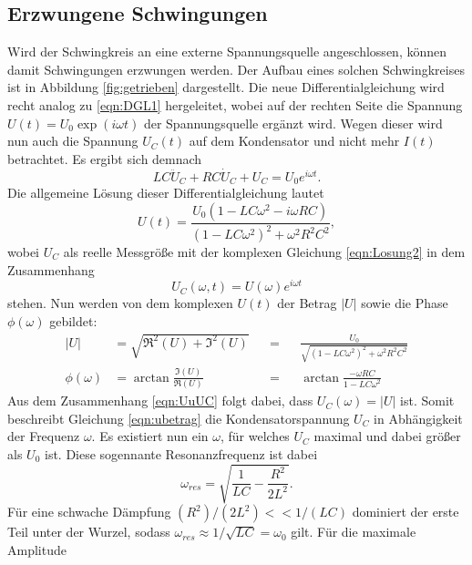 \subsection{Erzwungene Schwingungen}
Wird der Schwingkreis an eine externe Spannungsquelle angeschlossen, können damit Schwingungen erzwungen werden. Der Aufbau eines solchen Schwingkreises
ist in Abbildung \ref{fig:getrieben} dargestellt. Die neue Differentialgleichung wird recht analog zu \eqref{eqn:DGL1} hergeleitet, wobei auf der
rechten Seite die Spannung $U(t)=U_0\exp(i\omega t)$ der Spannungsquelle ergänzt wird. Wegen dieser wird nun auch die Spannung $U_C(t)$ auf dem Kondensator
und nicht mehr $I(t)$ betrachtet. Es ergibt sich demnach
\begin{equation*}
    LC\ddot{U}_C+RC\dot{U}_C+U_C=U_0e^{i\omega t}   .
    \label{eqn:DGL2}
\end{equation*}
Die allgemeine Lösung dieser Differentialgleichung lautet
\begin{equation}
    U(t)=\frac{U_0(1-LC\omega^2-i\omega RC)}{(1-LC\omega^2)^2+\omega^2R^2C^2}   ,
    \label{eqn:Losung2}
\end{equation}
wobei $U_C$ als reelle Messgröße mit der komplexen Gleichung \eqref{eqn:Losung2} in dem Zusammenhang
\begin{equation}
    U_C(\omega,t)=U(\omega)e^{i\omega t}
    \label{eqn:UuUC}
\end{equation}
stehen. Nun werden von dem komplexen $U(t)$ der Betrag $|U|$ sowie die Phase $\phi(\omega)$ gebildet:
\begin{align} %
    |U|          &= \sqrt{\Re^2(U)+\Im^2(U)}      & &=& &\frac{U_0}{\sqrt{(1-LC\omega^2)^2+\omega^2R^2C^2}} \label{eqn:ubetrag} \\
    \phi(\omega) &= \arctan{\frac{\Im(U)}{\Re(U)}}& &=& &\arctan{\frac{-\omega RC}{1-LC\omega^2}} \label{eqn:uphase}
\end{align}
Aus dem Zusammenhang \eqref{eqn:UuUC} folgt dabei, dass $U_C(\omega)=|U|$ ist. Somit beschreibt Gleichung \eqref{eqn:ubetrag} die Kondensatorspannung
$U_C$ in Abhängigkeit der Frequenz $\omega$. Es existiert nun ein $\omega$, für welches $U_C$ maximal und dabei größer als $U_0$ ist. Diese
sogennante Resonanzfrequenz ist dabei
\begin{equation}
    \omega_{res}=\sqrt{\frac{1}{LC}-\frac{R^2}{2L^2}}   .
    \label{eqn:resfre}
\end{equation}
Für eine schwache Dämpfung $(R^2)/(2L^2)<<1/(LC)$ dominiert der erste Teil unter der Wurzel, sodass $\omega_{res}\approx 1/\sqrt{LC}=\omega_0$ gilt. Für die maximale Amplitude
